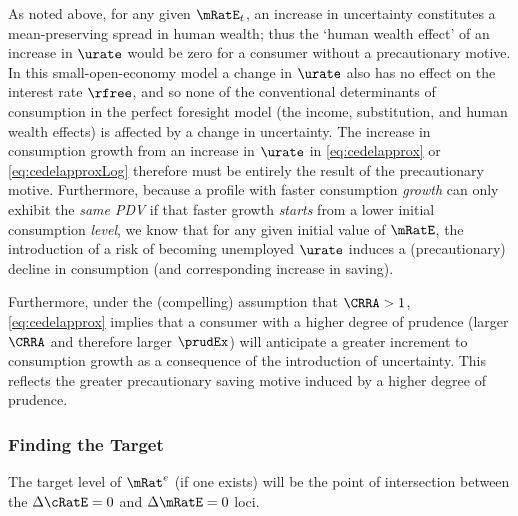 \documentclass{handout}
\begin{document}
As noted above, for any given $\mRatE_{t}$, an increase in uncertainty
constitutes a mean-preserving spread in human wealth; thus the `human
wealth effect' of an increase in $\urate$ would be zero for a consumer
without a precautionary motive.  In this small-open-economy model a
change in $\urate$ also has no effect on the interest rate $\rfree$,
and so none of the conventional determinants of consumption in the
perfect foresight model (the income, substitution, and human wealth
effects) is affected by a change in uncertainty.  The increase in consumption
growth from an increase in $\urate$ in
\eqref{eq:cedelapprox} or \eqref{eq:cedelapproxLog} therefore must be
entirely the result of the precautionary motive.  Furthermore, because 
a profile with faster consumption {\it growth} can only exhibit the {\it same PDV} if that faster growth 
{\it starts} from a lower initial consumption {\it level}, we know that for any given initial value of $\mRatE$, the introduction of a risk
of becoming unemployed $\urate$ induces a (precautionary) decline in consumption (and corresponding increase in
saving).

Furthermore, under the (compelling) assumption that $\CRRA > 1$, \eqref{eq:cedelapprox} implies that a consumer with
a higher degree of prudence (larger $\CRRA$ and therefore larger $\prudEx$) will
anticipate a greater increment to consumption growth as a consequence of the introduction of uncertainty.  This reflects the greater precautionary
saving motive induced by a higher degree of prudence.



\subsubsection{Finding the Target}

The target level of $\mRat^{e}$ (if one exists) will be the point of intersection between the $\dcEqZero$ and $\dmEqZero$ loci.  
\end{document}
